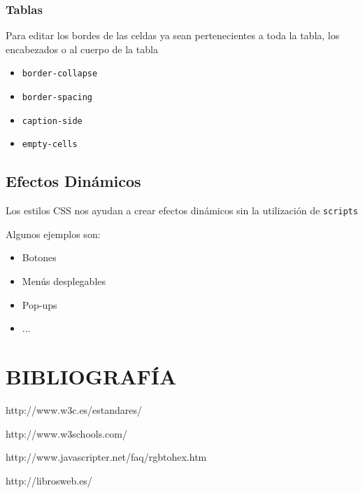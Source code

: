 \documentclass{beamer}
\begin{document}
\begin{frame}[fragile] %
\frametitle{Tablas}
	Para editar los bordes de las celdas ya sean pertenecientes a toda la tabla, los encabezados o al cuerpo de la tabla
	\begin{itemize}
	\item \verb|border-collapse|
	\item \verb|border-spacing|
	\item \verb|caption-side|
	\item \verb|empty-cells|
	\end{itemize}
\end{frame}
	\subsection{Efectos Dinámicos}
\begin{frame}[fragile] %
	Los estilos CSS nos ayudan a crear efectos dinámicos sin la utilización de \verb|scripts|
	
	Algunos ejemplos son:
	\begin{itemize}
	\item Botones
	\item Menús desplegables
	\item Pop-ups
	\item ...
	\end{itemize}
\end{frame}
	
\section{BIBLIOGRAFÍA}
\begin{frame}
	http://www.w3c.es/estandares/
	
	http://www.w3schools.com/
	
	http://www.javascripter.net/faq/rgbtohex.htm
	
	http://librosweb.es/
\end{frame}
\end{document}
